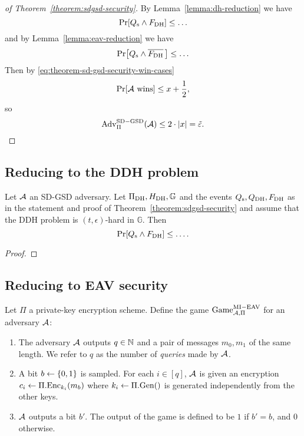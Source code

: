 \begin{proof}[of Theorem~\ref{theorem:sdgsd-security}]
	By Lemma~\vref{lemma:dh-reduction} we have
	\[
		\pr{\qs \land \fdh} \le \ldots
	\]
	and by Lemma~\vref{lemma:eav-reduction} we have
	\[
		\pr{\qs \land \overline{\fdh}\,} \le \ldots
	\]
	Then by \eqref{eq:theorem-sd-gsd-security-win-cases}
	\[
		\pr{\wins} \le x + \frac{1}{2},
	\] so
	\[
		\mathrm{Adv}_{\Pi}^{\mathrm{SD-GSD}}(\adv) \le 2 \cdot \abs*{x} = \tilde{\epsilon}.
	\]
\end{proof}

\subsection{Reducing to the DDH problem}

\begin{lemma} \label{lemma:dh-reduction}
	Let $\adv$ an SD-GSD adversary. Let $\dhies, \hdh, \mathbb{G}$ and the events $\qs, \qdh, \fdh$ as in the statement and proof of Theorem~\vref{theorem:sdgsd-security} and assume that the DDH problem is $(t, \epsilon)$-hard in $\mathbb{G}$. Then
	\[
		\pr{\qs \land \fdh} \le \ldots.
	\]
\end{lemma}
\begin{proof}
\end{proof}

\subsection{Reducing to EAV security}


\begin{definition}
	Let $\Pi$ a private-key encryption scheme. Define the game $\mathrm{Game}_{\adv, \Pi}^{\mathrm{MI-EAV}}$ for an adversary $\adv$:
	\begin{enumerate}[1.]
		\item The adversary $\adv$ outputs $q \in \N$ and a pair of messages $m_0, m_1$ of the same length. We refer to $q$ as the number of \emph{queries} made by $\adv$.
		\item A bit $b \from \{0, 1\}$ is sampled. For each $i \in [q]$, $\adv$ is given an encryption $c_i \from \Pi.\enc_{k_i}(m_b)$ where $k_i \from \Pi.\gen()$ is generated independently from the other keys.
		\item $\adv$ outputs a bit $b'$. The output of the game is defined to be $1$ if $b' = b$, and $0$ otherwise.
	\end{enumerate}
\end{definition}

